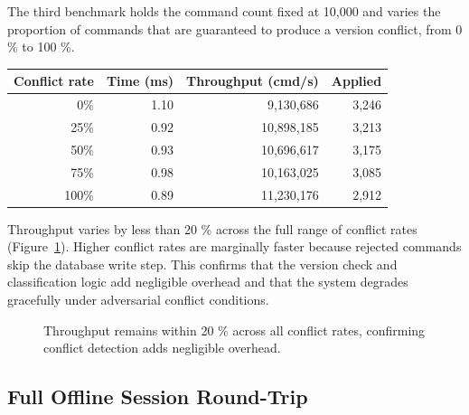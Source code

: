 \documentclass{article}
\begin{document}
The third benchmark holds the command count fixed at 10,000 and varies the proportion of commands that are guaranteed to produce a version conflict, from 0 \% to 100 \%.

\begin{center}
\begin{tabular}{rrrr}
\hline
Conflict rate & Time (ms) & Throughput (cmd/s) & Applied \\
\hline
0\%           & 1.10      & 9,130,686          & 3,246   \\
25\%          & 0.92      & 10,898,185         & 3,213   \\
50\%          & 0.93      & 10,696,617         & 3,175   \\
75\%          & 0.98      & 10,163,025         & 3,085   \\
100\%         & 0.89      & 11,230,176         & 2,912   \\
\hline
\end{tabular}
\end{center}

Throughput varies by less than 20 \% across the full range of conflict rates (Figure~\ref{fig:conflicts}). Higher conflict rates are marginally faster because rejected commands skip the database write step. This confirms that the version check and classification logic add negligible overhead and that the system degrades gracefully under adversarial conflict conditions.

\begin{figure}[h]
\centering
{}
\caption{Throughput remains within 20 \% across all conflict rates, confirming conflict detection adds negligible overhead.}
\label{fig:conflicts}
\end{figure}

\subsection{Full Offline Session Round-Trip}
\end{document}
